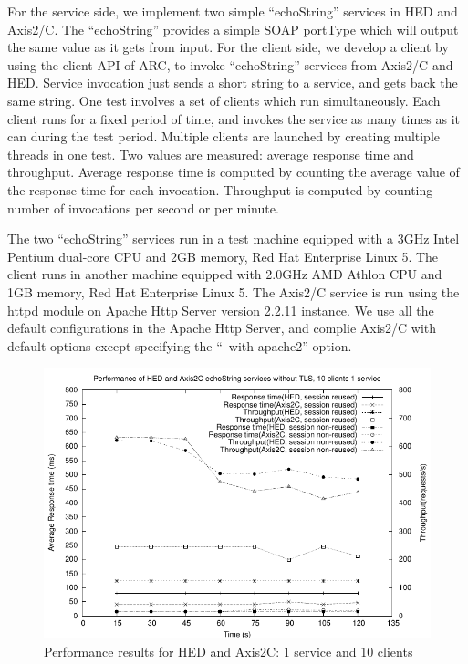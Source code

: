 \documentclass[conference]{IEEEtran}
\begin{document}
For the service side, we implement two simple ``echoString'' services in HED and
Axis2/C. The ``echoString'' provides a simple SOAP portType which will output the same value
as it gets from input. For the client side, we develop a client by using the client API of ARC, to
invoke ``echoString'' services from Axis2/C and HED. Service invocation just sends a short
string to a service, and gets back the same string. One test involves a set of clients
which run simultaneously. Each client runs for a fixed period of time, and invokes the service as many
times as it can during the test period. Multiple clients are launched by creating multiple threads in
one test. Two values are measured: average response time and throughput. Average response
time is computed by counting the average value of the response time for each invocation.
Throughput is computed by counting number of invocations per second or per minute.

The two ``echoString'' services run in a test machine equipped with a 3GHz Intel
Pentium dual-core CPU and 2GB memory, Red Hat Enterprise Linux 5. The client runs in another
machine equipped with 2.0GHz AMD Athlon CPU and 1GB memory, Red Hat Enterprise Linux 5. The
Axis2/C service is run using the httpd module on Apache Http Server version 2.2.11 instance. 
We use all the default configurations in the Apache Http Server, and complie Axis2/C
with default options except specifying the ``--with-apache2'' option.

\begin{figure}
\includegraphics[width=0.9\columnwidth]{HED2Axis_thread10.pdf}
\caption{Performance results for HED and Axis2C: 1 service and 10 clients}
\label{fig:HED2Axis_thread10}
\end{figure}
\end{document}
